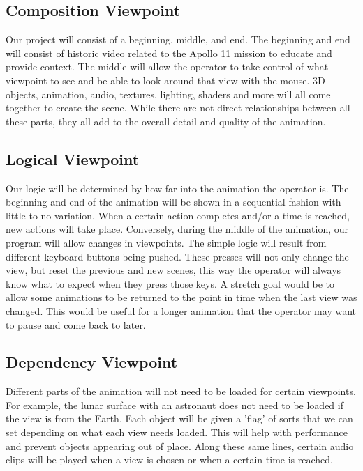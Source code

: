 \documentclass[onecolumn, draftclsnofoot,10pt, compsoc]{IEEEtran}
\begin{document}
    \subsection{Composition Viewpoint}
    
    Our project will consist of a beginning, middle, and end. The beginning and end will consist of historic video related to the Apollo 11 mission to educate and provide context. The middle will allow the operator to take control of what viewpoint to see and be able to look around that view with the mouse. 3D objects, animation, audio, textures, lighting, shaders and more will all come together to create the scene. While there are not direct relationships between all these parts, they all add to the overall detail and quality of the animation. 
    
    \subsection{Logical Viewpoint}

    Our logic will be determined by how far into the animation the operator is. The beginning and end of the animation will be shown in a sequential fashion with little to no variation. When a certain action completes and/or a time is reached, new actions will take place. Conversely, during the middle of the animation, our program will allow changes in viewpoints. The simple logic will result from different keyboard buttons being pushed. These presses will not only change the view, but reset the previous and new scenes, this way the operator will always know what to expect when they press those keys. A stretch goal would be to allow some animations to be returned to the point in time when the last view was changed. This would be useful for a longer animation that the operator may want to pause and come back to later. 
    
    \subsection{Dependency Viewpoint}

    Different parts of the animation will not need to be loaded for certain viewpoints. For example, the lunar surface with an astronaut does not need to be loaded if the view is from the Earth. Each object will be given a 'flag' of sorts that we can set depending on what each view needs loaded. This will help with performance and prevent objects appearing out of place. Along these same lines, certain audio clips will be played when a view is chosen or when a certain time is reached. 
    
\end{document}
